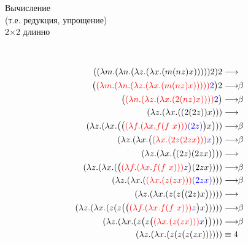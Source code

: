 \begin{frame}[plain]{Вычисление \\(т.е. редукция, упрощение) \\2$\times$2 длинно}
\def\betaarr{\longrightarrow\!\!\beta}
\def\numTWO{\ensuremath{\lam{f}{\lam{x}{f(f\ x)}}}}
\setcounter{equation}{0}
\begin{figure}[t]
  \begin{subfigure}[t]{0.35\textwidth}
  $\qquad$
  \end{subfigure}
  \begin{subfigure}[t]{0.55\textwidth}
        \vspace{-8em}
        \begin{align}
          \apppl{\app{\lam{m}{\lam{n}{\lam{z}{\lam{x}{(m \app{n}{z} x)}}}}}{2}}{2} & \longrightarrow \\
          \Apppl{\Redex{\lam{m}{\lam{n}{\lam{z}{\lam{x}{(m \app{n}{z} x)}}}}}{2}}{2} & \betaarr \\
          \Redex{\lam{n}{\lam{z}{\lam{x}{(2 \app{n}{z} x)}}}}{2} & \betaarr \\
          \lam{z}{\lam{x}{\app{\app{2}{\app{2}{z}}}{x}}} & \longrightarrow \\
          \lam{z}{\lam{x}{\App{\Redex{\numTWO}{\app{2}{z}}}{x}}} & \betaarr \\
          \lam{z}{\lam{x}{\Redex{\lam{x}{(2 z (2 z x))}}{x}}} & \betaarr \\
          \lam{z}{\lam{x}{\App{\app{2}{z}}{(2 z x)}}} & \longrightarrow \\
          \lam{z}{\lam{x}{\app{\Redex{\numTWO}{z}}{(2 z x)}}} & \betaarr \\
          \lam{z}{\lam{x}{\redex{\lam{x}{\app{z}{\app{z}{x}}}}{(2 z x)}}} & \betaarr \\
          \lam{z}{\lam{x}{\app{z}{\app{z}{\App{\app{2}{z}}{x}}}}} & \longrightarrow \\
          \lam{z}{\lam{x}{\app{z}{\app{z}{\App{\Redex{\numTWO}{z}}{x}}}}} & \betaarr \\
          \lam{z}{\lam{x}{\app{z}{\App{z}{\Redex{\lam{x}{\app{z}{\app{z}{x}}}}{x}}}}} & \betaarr \\
          \lam{z}{\lam{x}{\app{z}{\app{z}{\app{z}{\app{z}{x}}}}}} & \equiv 4
        \end{align}
  \end{subfigure}
\end{figure}

\end{frame}

